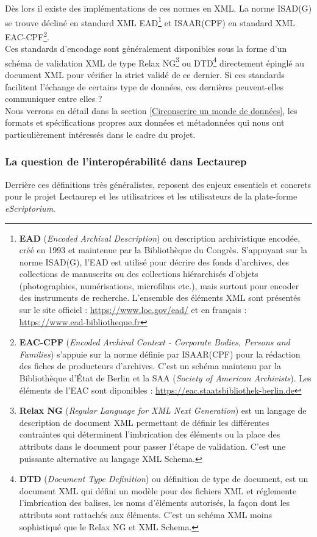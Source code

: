 Dès lors il existe des implémentations de ces normes en XML. La norme ISAD(G) se trouve décliné en standard XML EAD\footnote{\textbf{EAD} (\textit{Encoded Archival Description}) ou description archivistique encodée, créé en 1993 et maintenue par la Bibliothèque du Congrès. S'appuyant sur la norme ISAD(G), l'EAD est utilisé pour décrire des fonds d'archives, des collections de manuscrits ou des collections hiérarchisés d'objets (photographies, numérisations, microfilms etc.), mais surtout pour encoder des instruments de recherche. L'ensemble des éléments XML sont présentés sur le site officiel : \url{https://www.loc.gov/ead/} et en français : \url{https://www.ead-bibliotheque.fr}} et ISAAR(CPF) en standard XML EAC-CPF\footnote{\textbf{EAC-CPF} (\textit{Encoded Archival Context - Corporate Bodies, Persons and Families}) s'appuie sur la norme définie par ISAAR(CPF) pour la rédaction des fiches de producteurs d'archives. C'est un schéma maintenu par la Bibliothèque d'État de Berlin et la SAA (\textit{Society of American Archivists}). Les éléments de l'EAC sont diponibles : \url{https://eac.staatsbibliothek-berlin.de}}.\\

Ces standards d'encodage sont généralement disponibles sous la forme d'un schéma de validation XML de type Relax NG\footnote{\textbf{Relax NG} (\textit{Regular Language for XML Next Generation}) est un langage de description de document XML permettant de définir les différentes contraintes qui déterminent l'imbrication des éléments ou la place des attributs dans le document pour passer l'étape de validation. C'est une puissante alternative au langage XML Schema.} ou DTD\footnote{\textbf{DTD} (\textit{Document Type Definition}) ou définition de type de document, est un document XML qui défini un modèle pour des fichiers XML et réglemente l'imbrication des balises, les noms d'éléments autorisés, la façon dont les attributs sont rattachés aux éléments. C'est un schéma XML moins sophistiqué que le Relax NG et XML Schema.} directement épinglé au document XML pour vérifier la strict validé de ce dernier. 
Si ces standards facilitent l'échange de certains type de données, ces dernières peuvent-elles communiquer entre elles ?\\

Nous verrons en détail dans la section \ref{Circonscrire un monde de données}, les formats et spécifications propres aux données et métadonnées qui nous ont particulièrement intéressés dans le cadre du projet.
\newpage
\subsubsection{La question de l'interopérabilité dans Lectaurep}
Derrière ces définitions très généralistes, reposent des enjeux essentiels et concrets pour le projet Lectaurep et les utilisatrices et les utilisateurs de la plate-forme \textit{eScriptorium}. \\

